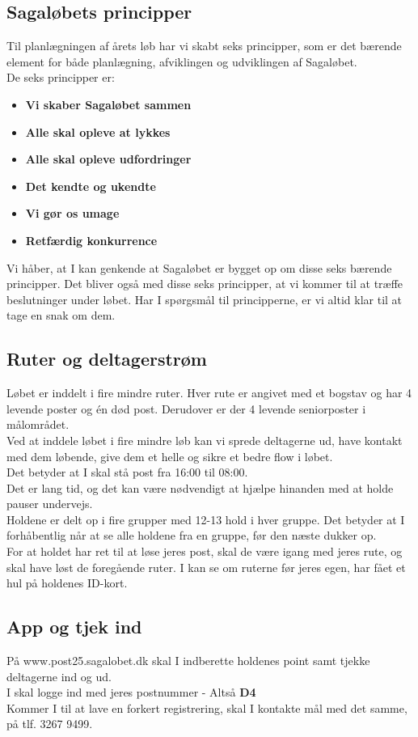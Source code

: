 \subsection{Sagaløbets principper}
Til planlægningen af årets løb har vi skabt seks principper, som er det bærende element for både planlægning, afviklingen og udviklingen af Sagaløbet.\\
De seks principper er:
\begin{itemize}
  \item \textbf{Vi skaber Sagaløbet sammen}
  \item \textbf{Alle skal opleve at lykkes}
  \item \textbf{Alle skal opleve udfordringer}
  \item \textbf{Det kendte og ukendte}
  \item \textbf{Vi gør os umage}
  \item \textbf{Retfærdig konkurrence}
\end{itemize}
Vi håber, at I kan genkende at Sagaløbet er bygget op om disse seks bærende principper. Det bliver også med disse seks principper, at vi kommer til at træffe beslutninger under løbet. Har I spørgsmål til principperne, er vi altid klar til at tage en snak om dem.
\subsection{Ruter og deltagerstrøm}
Løbet er inddelt i fire mindre ruter. Hver rute er angivet med et bogstav og har 4 levende poster og én død post. Derudover er der 4 levende seniorposter i målområdet.\\
Ved at inddele løbet i fire mindre løb kan vi sprede deltagerne ud, have kontakt med dem løbende, give dem et helle og sikre et bedre flow i løbet.\\
\newline
Det betyder at I skal stå post fra 16:00 til 08:00.\\
Det er lang tid, og det kan være nødvendigt at hjælpe hinanden med at holde pauser undervejs.\\
\newline
Holdene er delt op i fire grupper med 12-13 hold i hver gruppe. Det betyder at I forhåbentlig når at se alle holdene fra en gruppe, før den næste dukker op.\\
For at holdet har ret til at løse jeres post, skal de være igang med jeres rute, og skal have løst de foregående ruter. I kan se om ruterne før jeres egen, har fået et hul på holdenes ID-kort.
\subsection{App og tjek ind}
På www.post25.sagalobet.dk skal I indberette holdenes point samt tjekke deltagerne ind og ud.\\
I skal logge ind med jeres postnummer - Altså \textbf{D4}\\
\newline
Kommer I til at lave en forkert registrering, skal I kontakte mål med det samme, på tlf. 3267 9499.
\newpage
\vspace*{.4cm}
